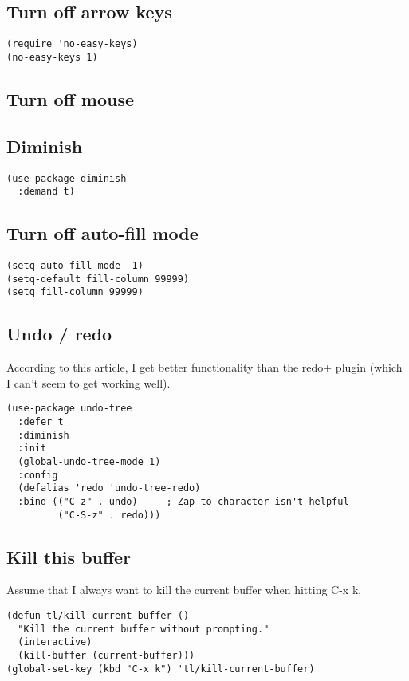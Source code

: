 \documentclass[12pt]{article}
\begin{document}
\subsection{Turn off arrow keys}
\label{sec:orgdb768f0}

\begin{verbatim}
(require 'no-easy-keys)
(no-easy-keys 1)
\end{verbatim}

\subsection{Turn off mouse}
\label{sec:org3131597}

\subsection{Diminish}
\label{sec:org259cc10}

\begin{verbatim}
(use-package diminish
  :demand t)
\end{verbatim}

\subsection{Turn off auto-fill mode}
\label{sec:orgb079f7e}

\begin{verbatim}
(setq auto-fill-mode -1)
(setq-default fill-column 99999)
(setq fill-column 99999)
\end{verbatim}

\subsection{Undo / redo}
\label{sec:org38db542}
According to this article, I get better functionality than the redo+ plugin (which I can’t seem to get working well).
\begin{verbatim}
(use-package undo-tree
  :defer t
  :diminish
  :init
  (global-undo-tree-mode 1)
  :config
  (defalias 'redo 'undo-tree-redo)
  :bind (("C-z" . undo)     ; Zap to character isn't helpful
         ("C-S-z" . redo)))

\end{verbatim}

\subsection{Kill this buffer}
\label{sec:org92eea89}
Assume that I always want to kill the current buffer when hitting C-x k.
\begin{verbatim}
(defun tl/kill-current-buffer ()
  "Kill the current buffer without prompting."
  (interactive)
  (kill-buffer (current-buffer)))
(global-set-key (kbd "C-x k") 'tl/kill-current-buffer)
\end{verbatim}
\end{document}

